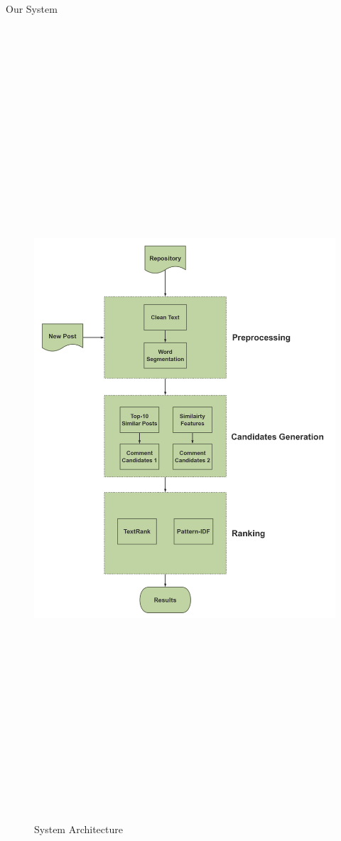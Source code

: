 \documentclass[final,hyperref={pdfpagelabels=false}]{beamer}
\begin{document}
\begin{frame}{}
\begin{block}{\large Our System}
\begin{columns}[t]
\begin{column}{.48\linewidth}
\begin{figure}
            \includegraphics[width=36cm, height=45.3cm]{stc-flow-v-big.png}
            \caption{System Architecture}
          \end{figure}
        \end{column}
      \end{columns}
      

\end{block}
\end{frame}
\end{document}
